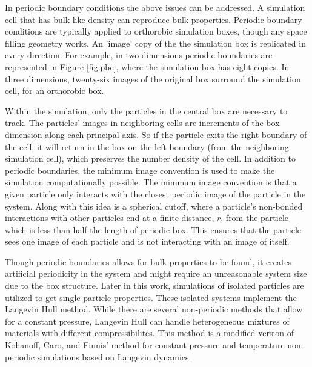 In periodic boundary conditions the above issues can be addressed. A simulation cell that has bulk-like density can reproduce bulk properties. Periodic boundary conditions are typically applied to orthorobic simulation boxes, though any space filling geometry works. An 'image' copy of the the simulation box is replicated in every direction. For example, in two dimensions periodic boundaries are represented in Figure \ref{fig:pbc}, where the simulation box has eight copies. In three dimensions, twenty-six images of the original box surround the simulation cell, for an orthorobic box.
    
Within the simulation, only the particles in the central box are necessary to track. The particles' images in neighboring cells are increments of the box dimension along each principal axis. 
So if the particle exits the right boundary of the cell, it will return in the box on the left boundary (from the neighboring simulation cell), which preserves the number density of the cell. 
In addition to periodic boundaries, the minimum image convention is used to make the simulation computationally possible. The minimum image convention is that a given particle only interacts with the closest periodic image of the particle in the system. 
Along with this idea is a spherical cutoff, where a particle's non-bonded interactions with other particles end at a finite distance, $r$, from the particle which is less than half the length of periodic box. This ensures that the particle sees one image of each particle and is not interacting with an image of itself. 

Though periodic boundaries allows for bulk properties to be found, it creates artificial periodicity in the system and might require an unreasonable system size due to the box structure. Later in this work, simulations of isolated particles are utilized to get single particle properties. 
These isolated systems implement the Langevin Hull method. While there are several non-periodic methods that allow for a constant pressure, Langevin Hull can handle heterogeneous mixtures of materials with different compressibilites.\cite{Vardeman2011} This method is a modified version of Kohanoff, Caro, and Finnis' method for constant pressure and temperature non-periodic simulations based on Langevin dynamics.\cite{Kohanoff:2005qm, Baltazar:2006ru} 

